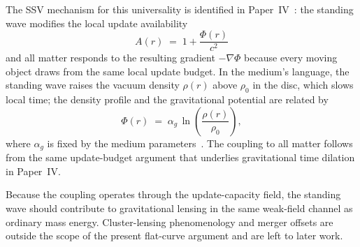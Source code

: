 \documentclass[11pt,a4paper]{article}
\begin{document}
The SSV mechanism for this universality is identified in Paper~IV~\cite{SSV-IV}: the
standing wave modifies the local update availability
\begin{equation}
  A(r) \;=\; 1 + \frac{\Phi(r)}{c^2}
  \label{eq:availability}
\end{equation}
and all matter responds to the resulting gradient $-\nabla\Phi$ because every moving object
draws from the same local update budget.  In the medium's language, the standing wave raises
the vacuum density $\rho(r)$ above $\rho_0$ in the disc, which slows local time; the density
profile and the gravitational potential are related by
\begin{equation}
  \Phi(r) \;=\; \alpha_g\,\ln\!\!\left(\frac{\rho(r)}{\rho_0}\right),
  \label{eq:phi_rho}
\end{equation}
where $\alpha_g$ is fixed by the medium parameters~\cite{SSV-II}.  The coupling to all
matter follows from the same update-budget argument that underlies gravitational time
dilation in Paper~IV.

Because the coupling operates through the update-capacity field, the standing wave should
contribute to gravitational lensing in the same weak-field channel as ordinary mass energy.
Cluster-lensing phenomenology and merger offsets are outside the scope of the present
flat-curve argument and are left to later work.
\end{document}

